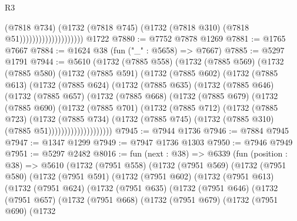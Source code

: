 \begin{lexlean}{R3}
\begin{coremodule}
                                      (@7818 @734)
                                      (@1732
                                        (@7818 @745)
                                        (@1732 (@7818 @310) (@7818 @51))))))))))))))))))))
    @1722
@7880 := @7752 @7878 @1269
@7881 := @1765 @7667
@7884 := @1624 @38 (fun ("_" : @5658) => @7667)
@7885 := @5297 @1791
@7944 := @5610
    (@1732
      (@7885 @558)
      (@1732
        (@7885 @569)
        (@1732
          (@7885 @580)
          (@1732
            (@7885 @591)
            (@1732
              (@7885 @602)
              (@1732
                (@7885 @613)
                (@1732
                  (@7885 @624)
                  (@1732
                    (@7885 @635)
                    (@1732
                      (@7885 @646)
                      (@1732
                        (@7885 @657)
                        (@1732
                          (@7885 @668)
                          (@1732
                            (@7885 @679)
                            (@1732
                              (@7885 @690)
                              (@1732
                                (@7885 @701)
                                (@1732
                                  (@7885 @712)
                                  (@1732
                                    (@7885 @723)
                                    (@1732
                                      (@7885 @734)
                                      (@1732
                                        (@7885 @745)
                                        (@1732 (@7885 @310) (@7885 @51))))))))))))))))))))
@7945 := @7944 @1736
@7946 := @7884 @7945
@7947 := @1347 @1299
@7949 := @7947 @1736 @1303
@7950 := @7946 @7949
@7951 := @5297 @2482
@8016 := fun (next : @38) =>
  @6339
    (fun (position : @38) =>
    @5610
      (@1732
        (@7951 @558)
        (@1732
          (@7951 @569)
          (@1732
            (@7951 @580)
            (@1732
              (@7951 @591)
              (@1732
                (@7951 @602)
                (@1732
                  (@7951 @613)
                  (@1732
                    (@7951 @624)
                    (@1732
                      (@7951 @635)
                      (@1732
                        (@7951 @646)
                        (@1732
                          (@7951 @657)
                          (@1732
                            (@7951 @668)
                            (@1732
                              (@7951 @679)
                              (@1732
                                (@7951 @690)
                                (@1732

\end{coremodule}
\end{lexlean}
